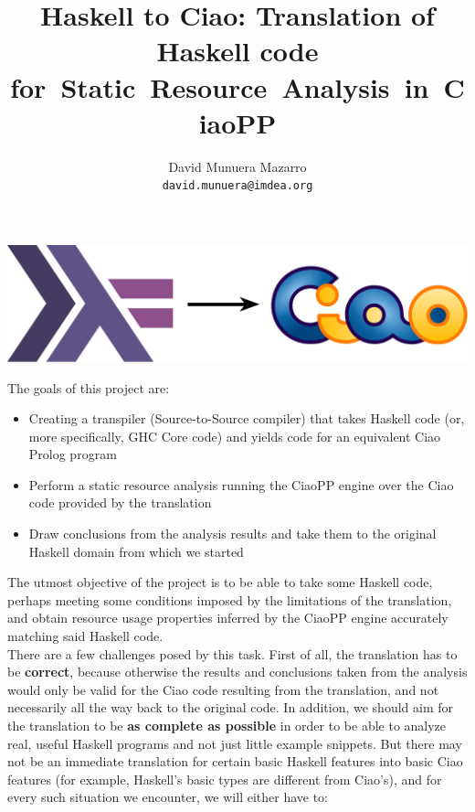 \documentclass[11pt]{article}
\title{
  Haskell to Ciao: Translation of Haskell code for~Static~Resource~Analysis~in~CiaoPP}
\author{David Munuera Mazarro \\ \texttt{david.munuera@imdea.org}}
\date{}
\begin{document}

\pagebreak

\begin{minipage}{1.0\linewidth}

  {\hspace{5.8cm}
    \includegraphics[scale=0.2]{img/hs-to-ciao_logo.pdf}}

  \vspace{-0.7cm}

\maketitle
  
\end{minipage}

The goals of this project are:
\begin{itemize}
\item Creating a transpiler (Source-to-Source compiler) that takes Haskell code (or, more specifically, GHC Core code)
  and yields code for an equivalent Ciao Prolog program
\item Perform a static resource analysis
  running the CiaoPP engine over the Ciao code provided by the translation
\item Draw conclusions from the analysis results
  and take them to the original Haskell domain from which we started
\end{itemize}
The utmost objective of the project is to be able to take some Haskell code,
perhaps meeting some conditions imposed by the limitations of the translation,
and obtain resource usage properties inferred by
the CiaoPP engine accurately matching said Haskell code. \\

There are a few challenges posed by this task.
First of all, the translation has to be \textbf{correct},
because otherwise the results and conclusions taken from the analysis
would only be valid for the Ciao code resulting from the translation,
and not necessarily all the way back to the original code. In addition,
we should aim for the translation to be \textbf{as complete as possible} in order
to be able to analyze real, useful Haskell programs and not just
little example snippets.
But there may not be an immediate translation for certain basic Haskell features
into basic Ciao features (for example, Haskell's basic types are
different from Ciao's), and for every such situation we encounter,
we will either have to:
\end{document}
